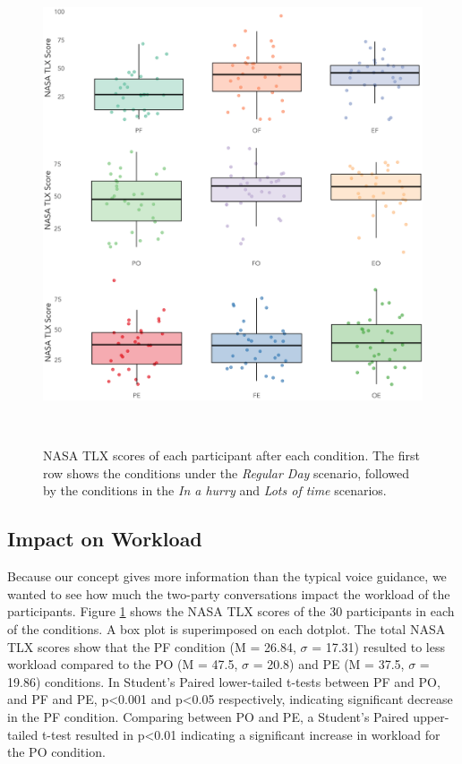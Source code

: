 \begin{figure}
\centering
  \includegraphics[scale=0.7]{figures/s2-workloads.png}
  \caption{NASA TLX scores of each participant after each condition. The first row shows the conditions under the \textit{Regular Day} scenario, followed by the conditions in the \textit{In a hurry} and \textit{Lots of time} scenarios.}~\label{fig:workloads}
\end{figure}

\subsection{Impact on Workload}
Because our concept gives more information than the typical voice guidance, we wanted to see how much the two-party conversations impact the workload of the participants. Figure \ref{fig:workloads} shows the NASA TLX scores of the 30 participants in each of the conditions. A box plot is superimposed on each dotplot. The total NASA TLX scores show that the PF condition (M = 26.84, $\sigma$ = 17.31) resulted to less workload compared to the PO (M = 47.5, $\sigma$ = 20.8) and PE (M = 37.5, $\sigma$ = 19.86) conditions. In Student's Paired lower-tailed t-tests between PF and PO, and PF and PE, p<0.001 and p<0.05 respectively, indicating significant decrease in the PF condition. Comparing between PO and PE, a Student's Paired upper-tailed t-test resulted in p<0.01 indicating a significant increase in workload for the PO condition.

